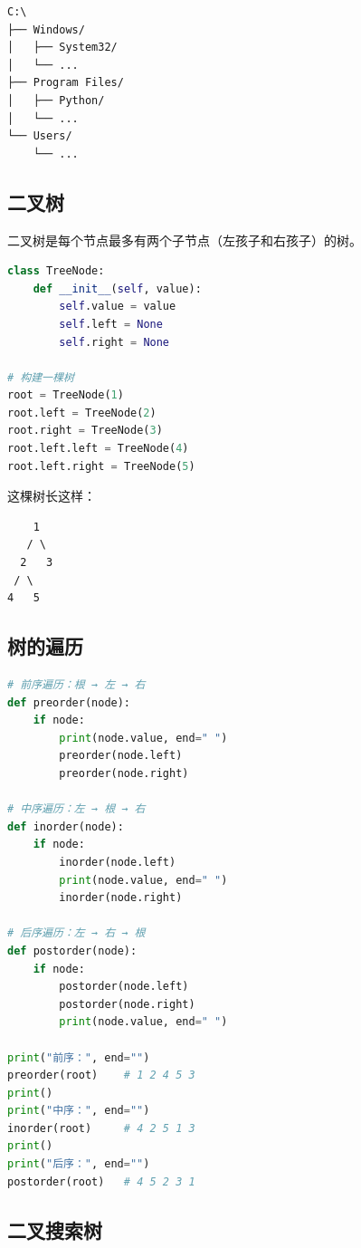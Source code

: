 \documentclass[a4paper,12pt]{ctexart}
\begin{document}
\begin{verbatim}
C:\
├── Windows/
│   ├── System32/
│   └── ...
├── Program Files/
│   ├── Python/
│   └── ...
└── Users/
    └── ...
\end{verbatim}

\subsection*{二叉树}

二叉树是每个节点最多有两个子节点（左孩子和右孩子）的树。

\begin{lstlisting}[language=Python]
class TreeNode:
    def __init__(self, value):
        self.value = value
        self.left = None
        self.right = None

# 构建一棵树
root = TreeNode(1)
root.left = TreeNode(2)
root.right = TreeNode(3)
root.left.left = TreeNode(4)
root.left.right = TreeNode(5)
\end{lstlisting}

这棵树长这样：
\begin{verbatim}
    1
   / \
  2   3
 / \
4   5
\end{verbatim}

\subsection*{树的遍历}

\begin{lstlisting}[language=Python]
# 前序遍历：根 → 左 → 右
def preorder(node):
    if node:
        print(node.value, end=" ")
        preorder(node.left)
        preorder(node.right)

# 中序遍历：左 → 根 → 右
def inorder(node):
    if node:
        inorder(node.left)
        print(node.value, end=" ")
        inorder(node.right)

# 后序遍历：左 → 右 → 根
def postorder(node):
    if node:
        postorder(node.left)
        postorder(node.right)
        print(node.value, end=" ")

print("前序：", end="")
preorder(root)    # 1 2 4 5 3
print()
print("中序：", end="")
inorder(root)     # 4 2 5 1 3
print()
print("后序：", end="")
postorder(root)   # 4 5 2 3 1
\end{lstlisting}

\subsection*{二叉搜索树}
\end{document}
